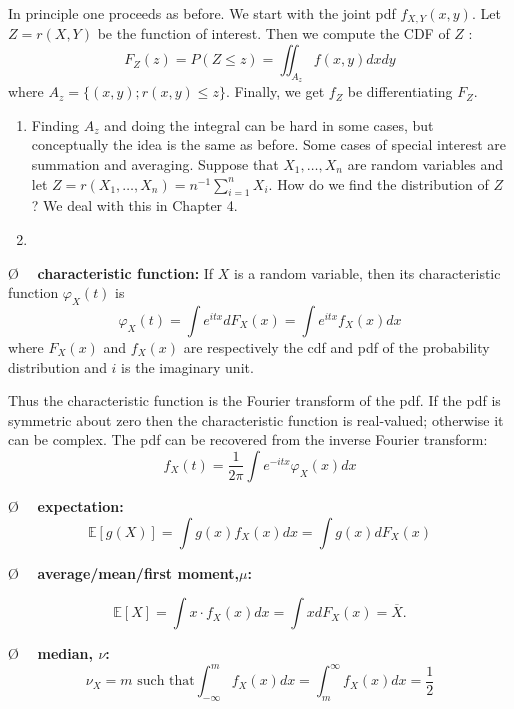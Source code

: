 \documentclass[13pt]{article}
\theoremstyle{definition}
\theoremstyle{remark}
\newenvironment{remark}
  {\pushQED{\qed}\renewcommand{\qedsymbol}{$\triangle$}\remarkx}
  {\popQED\endremarkx}
\newenvironment{point}
  {\O~~}
  {}
\begin{document}
In principle one proceeds as before. We start with the joint pdf $f_{X, Y}(x, y)$. Let $Z=r(X, Y)$ be the function of interest. Then we compute the CDF of $Z$ :
$$
F_{Z}(z)=P(Z \leq z)=\iint_{A_{z}} f(x, y) d x d y
$$
where $A_{z}=\{(x, y) ; r(x, y) \leq z\}$. Finally, we get $f_{Z}$ be differentiating $F_{Z}$. 
\begin{remark}\hfill
    \begin{enumerate}
        \item Finding $A_{z}$ and doing the integral can be hard in some cases, but conceptually the idea is the same as before. Some cases of special interest are summation and averaging. Suppose that $X_{1}, \ldots, X_{n}$ are random variables and let $Z=r\left(X_{1}, \ldots, X_{n}\right)=n^{-1} \sum_{i=1}^{n} X_{i}$. How do we find the distribution of $Z$ ? We deal with this in Chapter 4.
        \item 
    \end{enumerate}
\end{remark}


\begin{point}
    \textbf{characteristic function:} If $X$ is a random variable, then its characteristic function $\varphi_X(t)$ is
$$\varphi_X(t)=\int e^{itx}dF_X(x)=\int e^{itx}f_X(x)dx$$
where $F_X(x)$ and $f_X(x)$ are respectively the cdf and pdf of the probability distribution and $i$ is the imaginary unit.

    Thus the characteristic function is the Fourier transform of the pdf. If the pdf is symmetric about zero then the characteristic function is real-valued; otherwise it can be complex. The pdf can be recovered from the inverse Fourier transform:
$$f_X(t)=\frac{1}{2\pi}\int e^{-itx}\varphi_X(x)dx$$

\end{point}


  \begin{point}
    \textbf{expectation:} 
    $$\mathbb{E}[g(X)]=\int{g(x)f_X(x)dx}=\int{g(x)dF_X(x)}$$

\end{point}

  \begin{point}
    \textbf{ average/mean/first moment,$\mu$:} 

    \[\mathbb{E}[X]=\int{x\cdot f_X(x)dx}=\int{xdF_X(x)} = \overline{X}.\]

\end{point}

  \begin{point}
    \textbf{median, $\nu$:} 
    $$\nu_X=m \text{ such that} \int_{-\infty}^m f_{X}(x)dx=\int_m^{\infty} f_X(x)dx=\frac{1}{2}$$

\end{point}
\end{document}
